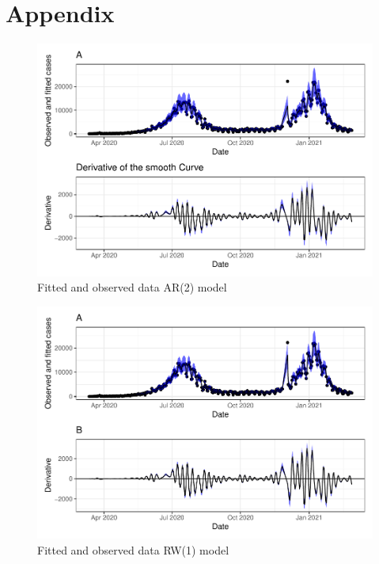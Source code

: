 \documentclass[10pt,letterpaper]{article}
\begin{document}
\newpage

\hypertarget{appendix}{%
\section{Appendix}\label{appendix}}

\setcounter{table}{0} \renewcommand{\thetable}{S\arabic{table}} \setcounter{figure}{0} \renewcommand{\thefigure}{S\arabic{figure}}

\begin{figure}[H]
\includegraphics[width=0.99\linewidth]{COVIDincidenceSA_files/figure-latex/unnamed-chunk-13-1} \caption{Fitted and observed data AR(2) model}\label{fig:unnamed-chunk-13}
\end{figure}

\begin{figure}[H]
\includegraphics[width=0.99\linewidth]{COVIDincidenceSA_files/figure-latex/unnamed-chunk-14-1} \caption{Fitted and observed data RW(1) model}\label{fig:unnamed-chunk-14}
\end{figure}
\end{document}
